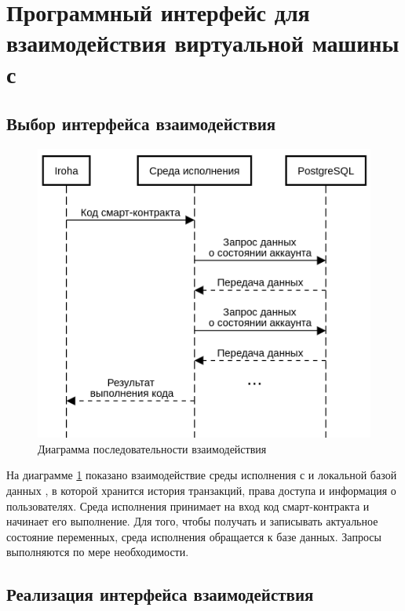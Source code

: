 \section{Программный интерфейс для взаимодействия виртуальной машины с }
\subsection{Выбор интерфейса взаимодействия}
\begin{figure}[h]
 	\includegraphics{interactionPog.png}
	\caption{Диаграмма последовательности взаимодействия}
	\label {interaction}
\end{figure}
На диаграмме \ref{interaction} показано взаимодействие среды исполнения с  и локальной базой данных , в которой хранится история транзакций, права доступа и информация о пользователях.
Среда исполнения принимает на вход код смарт-контракта и начинает его выполнение.
Для того, чтобы получать и записывать актуальное состояние переменных, среда исполнения обращается к базе данных.
Запросы выполняются по мере необходимости.
\subsection{Реализация интерфейса взаимодействия}

